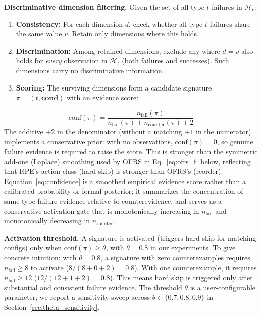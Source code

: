 \documentclass[journal]{IEEEtran}
\begin{document}
\textbf{Discriminative dimension filtering.} Given the set of all type-$t$ failures in $\mathcal{H}_t$:
\begin{enumerate}
    \item \textbf{Consistency:} For each dimension $d$, check whether all type-$t$ failures share the same value $v$. Retain only dimensions where this holds.
    \item \textbf{Discrimination:} Among retained dimensions, exclude any where $d = v$ also holds for \emph{every} observation in $\mathcal{H}_t$ (both failures and successes). Such dimensions carry no discriminative information.
    \item \textbf{Scoring:} The surviving dimensions form a candidate signature $\pi = (t, \mathbf{cond})$ with an evidence score:
\end{enumerate}
\begin{equation}
\text{conf}(\pi) = \frac{n_{\text{fail}}(\pi)}{n_{\text{fail}}(\pi) + n_{\text{counter}}(\pi) + 2}
\label{eq:confidence}
\end{equation}
The additive $+2$ in the denominator (without a matching $+1$ in the numerator) implements a conservative prior: with no observations, $\text{conf}(\pi){=}0$, so genuine failure evidence is required to raise the score. This is stronger than the symmetric add-one (Laplace) smoothing used by OFRS in Eq.~\ref{eq:ofrs_f} below, reflecting that RPE's action class (hard skip) is stronger than OFRS's (reorder). Equation~\ref{eq:confidence} is a smoothed empirical evidence score rather than a calibrated probability or formal posterior; it summarizes the concentration of same-type failure evidence relative to counterevidence, and serves as a conservative activation gate that is monotonically increasing in $n_{\text{fail}}$ and monotonically decreasing in $n_{\text{counter}}$.

\textbf{Activation threshold.} A signature is activated (triggers hard skip for matching configs) only when $\text{conf}(\pi) \geq \theta$, with $\theta = 0.8$ in our experiments. To give concrete intuition: with $\theta = 0.8$, a signature with zero counterexamples requires $n_{\text{fail}} \geq 8$ to activate ($8/(8+0+2) = 0.8$). With one counterexample, it requires $n_{\text{fail}} \geq 12$ ($12/(12+1+2) = 0.8$). This means hard skip is triggered only after substantial and consistent failure evidence. The threshold $\theta$ is a user-configurable parameter; we report a sensitivity sweep across $\theta \in \{0.7, 0.8, 0.9\}$ in Section~\ref{sec:theta_sensitivity}.
\end{document}
